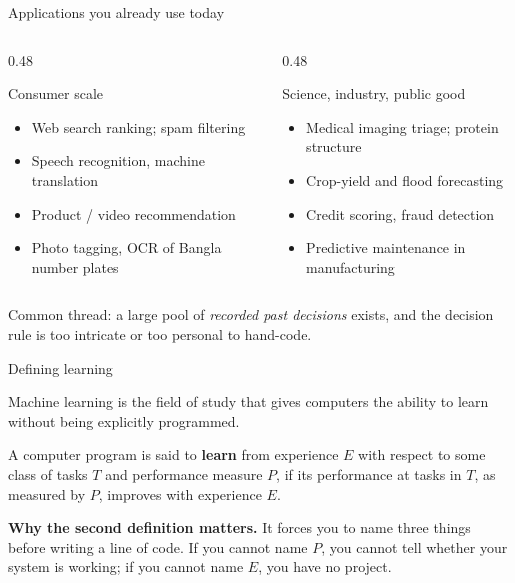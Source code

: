 \documentclass[aspectratio=169,10pt]{beamer}
\begin{document}
\begin{frame}{Applications you already use today}
  \small
  \begin{columns}[T,onlytextwidth]
    \begin{column}{0.48\textwidth}
      \begin{block}{Consumer scale}
        \begin{itemize}
          \item Web search ranking; spam filtering
          \item Speech recognition, machine translation
          \item Product / video recommendation
          \item Photo tagging, OCR of Bangla number plates
        \end{itemize}
      \end{block}
    \end{column}
    \begin{column}{0.48\textwidth}
      \begin{block}{Science, industry, public good}
        \begin{itemize}
          \item Medical imaging triage; protein structure
          \item Crop-yield and flood forecasting
          \item Credit scoring, fraud detection
          \item Predictive maintenance in manufacturing
        \end{itemize}
      \end{block}
    \end{column}
  \end{columns}
  \vspace{2mm}
  \begin{center}
    \small\color{cugray}
    Common thread: a large pool of \emph{recorded past decisions} exists, and the
    decision rule is too intricate or too personal to hand-code.
  \end{center}
\end{frame}

\begin{frame}{Defining learning}
  \begin{defnbox}
    Machine learning is the field of study that gives computers the ability to
    learn without being explicitly programmed.
  \end{defnbox}
  \vspace{2mm}
  \begin{defnbox}
    A computer program is said to \textbf{learn} from experience $E$ with respect
    to some class of tasks $T$ and performance measure $P$, if its performance at
    tasks in $T$, as measured by $P$, improves with experience $E$.
  \end{defnbox}
  \vspace{2mm}
  \small
  \textbf{Why the second definition matters.} It forces you to name three things
  before writing a line of code. If you cannot name $P$, you cannot tell whether
  your system is working; if you cannot name $E$, you have no project.
\end{frame}
\end{document}
